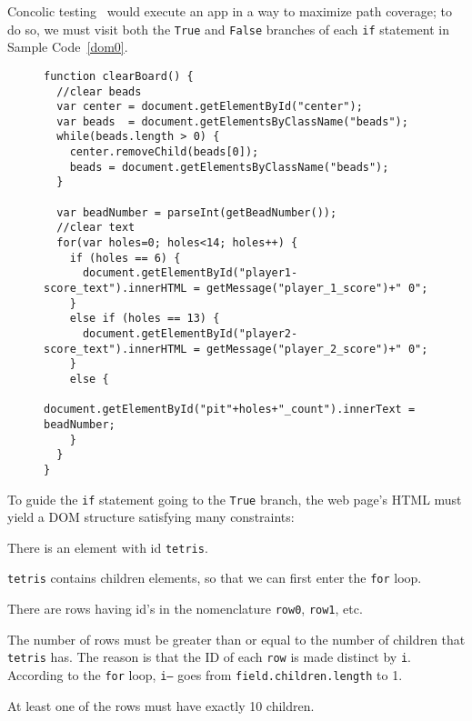 Concolic testing~\cite{cute} would execute an app in a way to maximize path coverage; to do so, we must visit both the {\tt True} and {\tt False} branches of each {\tt if} statement in Sample Code~\ref{dom0}.  
\begin{figure}
\begin{lstlisting}[caption=Example code whose tests and execution depend on the Document Object Model having a precise tree structure., label=dom0]
function clearBoard() {
  //clear beads
  var center = document.getElementById("center");
  var beads  = document.getElementsByClassName("beads");
  while(beads.length > 0) {
    center.removeChild(beads[0]);
    beads = document.getElementsByClassName("beads");
  }

  var beadNumber = parseInt(getBeadNumber());
  //clear text
  for(var holes=0; holes<14; holes++) {
    if (holes == 6) {
      document.getElementById("player1-score_text").innerHTML = getMessage("player_1_score")+" 0";
    }
    else if (holes == 13) {
      document.getElementById("player2-score_text").innerHTML = getMessage("player_2_score")+" 0";
    }
    else {
      document.getElementById("pit"+holes+"_count").innerText = beadNumber;
    }
  }
}
\end{lstlisting}
\end{figure}

\begin{figure*}[ht]
\centerline{}
\caption[Mancala game]{}
\label{trees}
\end{figure*}

To guide the {\tt if} statement going to the {\tt True} branch, the web page's HTML must yield a DOM structure satisfying many constraints:
\begin {compactitem}
\item There is an element with id {\tt tetris}.
\item {\tt tetris} contains children elements, so that we can first enter the {\tt for} loop.
\item There are rows having id's in the nomenclature {\tt row0}, {\tt row1}, etc.
\item The number of rows must be greater than or equal to the number of children that {\tt tetris} has.  The reason is that the ID of each {\tt row} is made distinct by {\tt i}.  According to the {\tt for} loop, {\tt i---} goes from {\tt field.children.length} to 1.
\item At least one of the rows must have exactly 10 children.
\end {compactitem}

